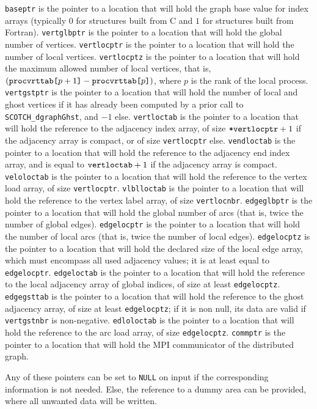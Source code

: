 \begin{itemize}
{\tt baseptr} is the pointer to a location that will hold the graph base
value for index arrays (typically $0$ for
structures built from C and $1$ for structures built from Fortran).
{\tt vertglbptr} is the pointer to a location that will hold the
global number of vertices.
{\tt vertlocptr} is the pointer to a location that will hold the
number of local vertices.
{\tt vertlocptz} is the pointer to a location that will hold the
maximum allowed number of local vertices, that is,
$(\mbox{\tt proc\lbt vrt\lbt tab[}p + 1\mbox{\tt]} -
\mbox{\tt proc\lbt vrt\lbt tab[}p\mbox{\tt]})$, where $p$ is the
rank of the local process.
{\tt vertgstptr} is the pointer to a location that will hold the
number of local and ghost vertices if it has already been computed
by a prior call to {\tt SCOTCH\_\lbt dgraph\lbo Ghst}, and $-1$ else.
{\tt vertloctab} is the pointer to a location that will hold the
reference to the adjacency index array, of size
$\mbox{\tt *vertlocptr} + 1$ if the adjacency array is compact,
or of size {\tt *vertlocptr} else.
{\tt vendloctab} is the pointer to a location that will hold the
reference to the adjacency end index array, and is equal to
$\mbox{\tt vertloctab} + 1$ if the adjacency array is compact.
{\tt veloloctab} is the pointer to a location that will hold the
reference to the vertex load array, of size {\tt *vertlocptr}.
{\tt vlblloctab} is the pointer to a location that will hold the
reference to the vertex label array, of size {\tt vertlocnbr}.
{\tt edgeglbptr} is the pointer to a location that will hold the
global number of arcs (that is, twice the number of global edges).
{\tt edgelocptr} is the pointer to a location that will hold the
number of local arcs (that is, twice the number of local edges).
{\tt edgelocptz} is the pointer to a location that will hold the
declared size of the local edge array, which must encompass all
used adjacency values; it is at least equal to {\tt *edgelocptr}.
{\tt edgeloctab} is the pointer to a location that will hold the
reference to the local adjacency array of global indices, of size
at least {\tt *edgelocptz}.
{\tt edgegsttab} is the pointer to a location that will hold the
reference to the ghost adjacency array, of size at least
{\tt *edgelocptz}; if it is non null, its data are valid if
{\tt vertgstnbr} is non-negative.
{\tt edloloctab} is the pointer to a location that will hold the
reference to the arc load array, of size {\tt *edgelocptz}.
{\tt commptr} is the pointer to a location that will hold the MPI
communicator of the distributed graph.

Any of these pointers can be set to {\tt NULL} on input if the
corresponding information is not needed. Else, the reference to a
dummy area can be provided, where all unwanted data will be written.


\end{itemize}
